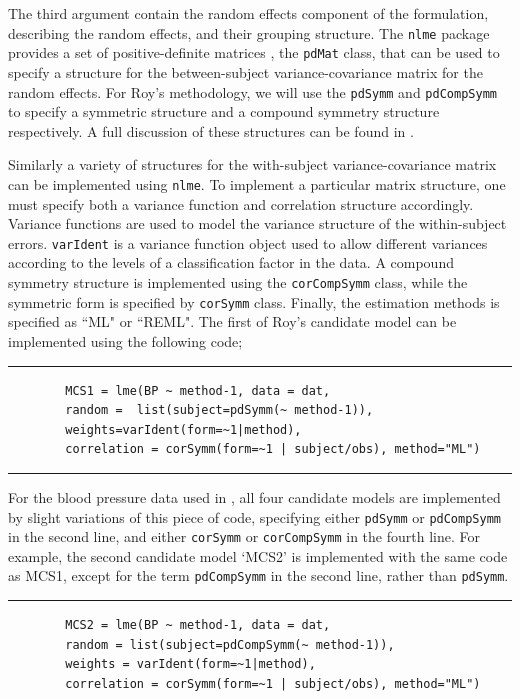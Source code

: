 \documentclass[12pt, a4paper]{report}
\theoremstyle{plain}
\theoremstyle{definition}
\theoremstyle{remark}
\begin{document}
The third argument contain the random effects component of the formulation, describing the random effects, and their grouping structure. The \texttt{nlme} package provides a set of positive-definite matrices , the \texttt{pdMat} class, that can be used to specify a structure for the between-subject variance-covariance matrix for the random effects. For Roy's methodology, we will use the \texttt{pdSymm} and \texttt{pdCompSymm} to specify a symmetric structure and a compound symmetry structure respectively. A full discussion of these structures can be found in \citet[pg. 158]{PB}.

Similarly a variety of structures for the with-subject variance-covariance matrix can be implemented using \texttt{nlme}. To implement a particular matrix structure, one must specify both a variance function and correlation structure accordingly. Variance functions are used to model the variance structure of the within-subject errors. \texttt{varIdent} is a variance function object used to allow different variances according to the levels of a classification factor in the data. A compound symmetry structure is implemented using the \texttt{corCompSymm} class, while the symmetric form is specified by \texttt{corSymm} class. Finally, the estimation methods is specified as ``ML" or ``REML".
\newpage
The first of Roy's candidate model can be implemented using the following code;\\
\hrule
\begin{verbatim}
        MCS1 = lme(BP ~ method-1, data = dat,
        random =  list(subject=pdSymm(~ method-1)),
        weights=varIdent(form=~1|method),
        correlation = corSymm(form=~1 | subject/obs), method="ML")
\end{verbatim}
\hrule
\vspace{1cm}
For the blood pressure data used in \citet{roy}, all four candidate models are implemented by slight variations of this piece of code, specifying either \texttt{pdSymm} or \texttt{pdCompSymm} in the second line, and either \texttt{corSymm} or \texttt{corCompSymm} in the fourth line.
For example, the second candidate model `MCS2' is implemented with the same code as MCS1, except for the term \texttt{pdCompSymm} in the second line, rather than \texttt{pdSymm}.
\\
\hrule
\begin{verbatim}
        MCS2 = lme(BP ~ method-1, data = dat,
        random = list(subject=pdCompSymm(~ method-1)),
        weights = varIdent(form=~1|method),
        correlation = corSymm(form=~1 | subject/obs), method="ML")
\end{verbatim}
\end{document}
